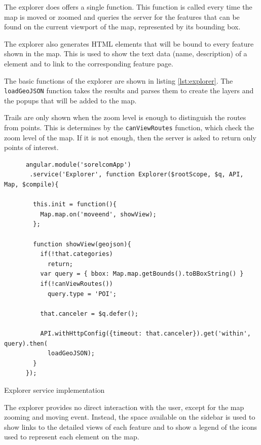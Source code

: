 The explorer does offers a single function. This function is called every time the map is moved or zoomed and queries the server for the features that can be found on the current viewport of the map, represented by its bounding box.

The explorer also generates HTML elements that will be bound to every feature shown in the map. This is used to show the text data (name, description) of a element and to link to the corresponding feature page.

The basic functions of the explorer are shown in listing \ref{lst:explorer}. The \texttt{loadGeoJSON} function takes the results and parses them to create the layers and the popups that will be added to the map.

Trails are only shown when the zoom level is enough to distinguish the routes from points. This is determines by the \texttt{canViewRoutes} function, which check the zoom level of the map. If it is not enough, then the server is asked to return only points of interest.

\begin{listing}[ht]\centering
  \begin{minipage}{.85\textwidth}
    \begin{verbatim}
      angular.module('sorelcomApp')
       .service('Explorer', function Explorer($rootScope, $q, API, Map, $compile){
    
        this.init = function(){
          Map.map.on('moveend', showView);
        };
    
        function showView(geojson){
          if(!that.categories)
            return;
          var query = { bbox: Map.map.getBounds().toBBoxString() }
          if(!canViewRoutes())
            query.type = 'POI';
     
          that.canceler = $q.defer();
     
          API.withHttpConfig({timeout: that.canceler}).get('within', query).then(
            loadGeoJSON);
        }
      });
    \end{verbatim}
  \end{minipage}
  \caption{Explorer service implementation}\label{lst:explorer}
\end{listing}

The explorer provides no direct interaction with the user, except for the map zooming and moving event. Instead, the space available on the sidebar is used to show links to the detailed views of each feature and to show a legend of the icons used to represent each element on the map.

